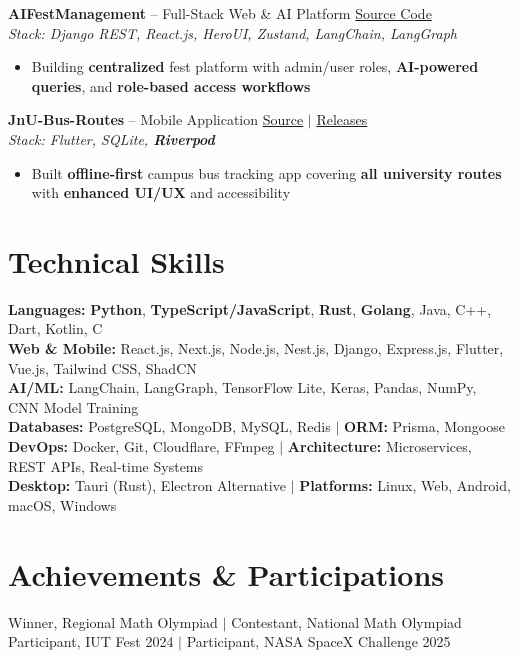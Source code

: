 \documentclass[10pt,a4paper]{article}
\begin{document}
\textbf{AIFestManagement} -- Full-Stack Web \& AI Platform \hfill \href{https://github.com/AhmedTrooper/AIFestManagement}{Source Code} \\
\textit{Stack: Django REST, React.js, HeroUI, Zustand, LangChain, LangGraph} \\[-6pt]
\begin{itemize}[leftmargin=12pt, itemsep=0pt, topsep=2pt]
    \item Building \textbf{centralized} fest platform with admin/user roles, \textbf{AI-powered queries}, and \textbf{role-based access workflows}
\end{itemize}

\textbf{JnU-Bus-Routes} -- Mobile Application \hfill \href{https://github.com/AhmedTrooper/JnU-Bus-Routes}{Source} $|$ \href{https://github.com/AhmedTrooper/JnU-Bus-Routes/releases}{Releases} \\
\textit{Stack: Flutter, SQLite, \textbf{Riverpod}} \\[-6pt]
\begin{itemize}[leftmargin=12pt, itemsep=0pt, topsep=2pt]
    \item Built \textbf{offline-first} campus bus tracking app covering \textbf{all university routes} with \textbf{enhanced UI/UX} and accessibility
\end{itemize}

\section{Technical Skills}
\textbf{Languages:} \textbf{Python}, \textbf{TypeScript/JavaScript}, \textbf{Rust}, \textbf{Golang}, Java, C++, Dart, Kotlin, C \\
\textbf{Web \& Mobile:} React.js, Next.js, Node.js, Nest.js, Django, Express.js, Flutter, Vue.js, Tailwind CSS, ShadCN \\
\textbf{AI/ML:} LangChain, LangGraph, TensorFlow Lite, Keras, Pandas, NumPy, CNN Model Training \\
\textbf{Databases:} PostgreSQL, MongoDB, MySQL, Redis $|$ \textbf{ORM:} Prisma, Mongoose \\
\textbf{DevOps:} Docker, Git, Cloudflare, FFmpeg $|$ \textbf{Architecture:} Microservices, REST APIs, Real-time Systems \\
\textbf{Desktop:} Tauri (Rust), Electron Alternative $|$ \textbf{Platforms:} Linux, Web, Android, macOS, Windows

\section{Achievements \& Participations}
Winner, Regional Math Olympiad $|$ Contestant, National Math Olympiad \\
Participant, IUT Fest 2024 $|$ Participant, NASA SpaceX Challenge 2025
\end{document}
